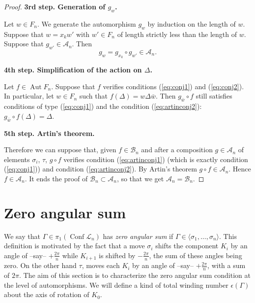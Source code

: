\documentclass[11pt]{amsart}
\begin{document}
\begin{proof}
\bigskip

\textbf{3rd step. Generation of $g_w$.}

Let $w \in F_n$. We generate the automorphism $g_w$ by induction on the length of $w$.
Suppose that $w = x_k w'$ with $w' \in F_n$ of length strictly less than the length of $w$.
Suppose that $g_{w'} \in  \mathcal{A}_n$. Then
$$g_w = g_{x_k} \circ g_{w'} \in \mathcal{A}_n.$$

\bigskip

\textbf{4th step. Simplification of the action on $\Delta$.}

Let $f\in {\mathop{\mathrm{Aut}}\nolimits} F_n$. Suppose that $f$ verifies conditions (\ref{eq:conj1}) and (\ref{eq:conj2}).
In particular, let $w \in F_n$ such that $f(\Delta)= w \Delta {\bar{{w}}}$.
Then $g_{{\bar{{w}}}} \circ f$ still satisfies conditions of type (\ref{eq:conj1})
and the condition (\ref{eq:artinconj2}):  $g_{{\bar{{w}}}} \circ f(\Delta)=\Delta$.

\bigskip

\textbf{5th step. Artin's theorem.}

Therefore we can suppose that, given $f \in \mathcal{B}_n$ and after a composition $g \in \mathcal{A}_n$ of elements $\sigma_i$, $\tau$, 
$g \circ f$ verifies condition (\ref{eq:artinconj1}) (which is exactly condition (\ref{eq:conj1})) and condition (\ref{eq:artinconj2}).
By Artin's theorem $g\circ f \in \mathcal{A}_n$. Hence $f \in \mathcal{A}_n$.
It ends the proof of $\mathcal{B}_n \subset \mathcal{A}_n$, so that we get 
$\mathcal{A}_n=\mathcal{B}_n$.

\end{proof}

\section{Zero angular sum}
\label{sec:zero}

We say that $\Gamma \in \pi_1({\mathop{\mathrm{Conf}}\nolimits} \mathcal{L}_n)$
has {\emph{{zero angular sum}}} if $\Gamma \in \langle \sigma_1,\ldots,\sigma_n\rangle$.
This definition is motivated by the fact that a move $\sigma_i$
shifts the component $K_i$ by an angle of --say-- $+\frac{2\pi}{n}$
while $K_{i+1}$ is shifted by $-\frac{2\pi}{n}$, the sum of these angles being zero.
On the other hand $\tau$, moves each $K_i$ by an angle of --say-- $+\frac{2\pi}{n}$,
with a sum of $2\pi$.
The aim of this section is to characterize the zero angular sum condition 
at the level of automorphisms. We will define a kind of total winding number 
$\epsilon(\Gamma)$ about the axis of rotation of $K_0$.
\end{document}
